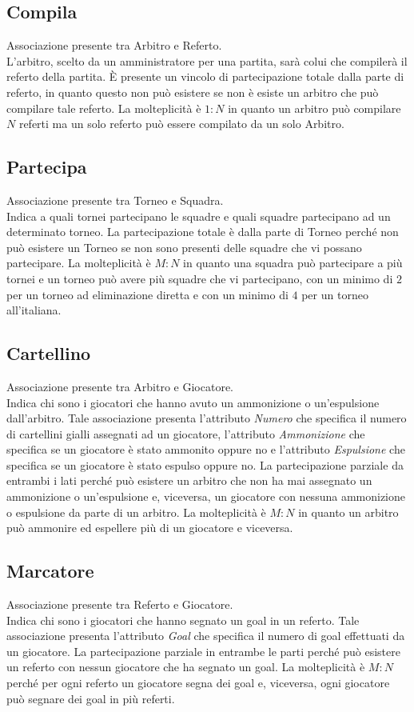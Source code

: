 	\subsection{Compila}
	Associazione presente tra Arbitro e Referto. \\
	L'arbitro, scelto da un amministratore per una partita, sarà colui che compilerà il referto della partita.
	È presente un vincolo di partecipazione totale dalla parte di referto, in quanto questo non può esistere se non è esiste un arbitro che può compilare tale referto.
	La molteplicità è $1:N$ in quanto un arbitro può compilare $N$ referti ma un solo referto può essere compilato da un solo Arbitro.
	
	\subsection{Partecipa}
	Associazione presente tra Torneo e Squadra. \\
	Indica a quali tornei partecipano le squadre e quali squadre partecipano ad un determinato torneo.
	La partecipazione totale è dalla parte di Torneo perché non può esistere un Torneo se non sono presenti delle squadre che vi possano partecipare.
	La molteplicità è $M:N$ in quanto una squadra può partecipare a più tornei e un torneo può avere più squadre che vi partecipano, con un minimo di $2$ per un torneo ad eliminazione diretta e con un minimo di $4$ per un torneo all'italiana.
	
	\subsection{Cartellino}
	Associazione presente tra Arbitro e Giocatore. \\
	Indica chi sono i giocatori che hanno avuto un ammonizione o un'espulsione dall'arbitro.
	Tale associazione presenta l’attributo \emph{Numero} che specifica il numero di cartellini gialli assegnati ad un giocatore, l'attributo \emph{Ammonizione} che specifica se un giocatore è stato ammonito oppure no e l'attributo \emph{Espulsione} che specifica se un giocatore è stato espulso oppure no.
	La partecipazione parziale da entrambi i lati perché può esistere un arbitro che non ha mai assegnato un ammonizione o un'espulsione e, viceversa, un giocatore con nessuna ammonizione o espulsione da parte di un arbitro.
	La molteplicità è $M:N$ in quanto un arbitro può ammonire ed espellere più di un giocatore e viceversa.
	
	\subsection{Marcatore}
	Associazione presente tra Referto e Giocatore. \\
	Indica chi sono i giocatori che hanno segnato un goal in un referto.
	Tale associazione presenta l’attributo \emph{Goal} che specifica il numero di goal effettuati da un giocatore.
	La partecipazione parziale in entrambe le parti perché può esistere un referto con nessun giocatore che ha segnato un goal.
	La molteplicità è $M:N$ perché per ogni referto un giocatore segna dei goal e, viceversa, ogni giocatore può segnare dei goal in più referti.
	
